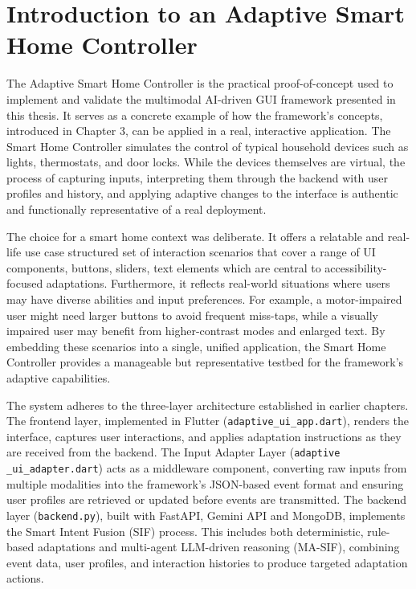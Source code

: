 \documentclass[openany]{book}
\begin{document}
\section{Introduction to an Adaptive Smart Home Controller}
The Adaptive Smart Home Controller is the practical proof-of-concept used to implement and validate the multimodal AI-driven GUI framework presented in this thesis. It serves as a concrete example of how the framework’s concepts, introduced in Chapter 3, can be applied in a real, interactive application. The Smart Home Controller simulates the control of typical household devices such as lights, thermostats, and door locks. While the devices themselves are virtual, the process of capturing inputs, interpreting them through the backend with user profiles and history, and applying adaptive changes to the interface is authentic and functionally representative of a real deployment.

The choice for a smart home context was deliberate. It offers a relatable and real-life use case structured set of interaction scenarios that cover a range of UI components, buttons, sliders, text elements which are central to accessibility-focused adaptations. Furthermore, it reflects real-world situations where users may have diverse abilities and input preferences. For example, a motor-impaired user might need larger buttons to avoid frequent miss-taps, while a visually impaired user may benefit from higher-contrast modes and enlarged text. By embedding these scenarios into a single, unified application, the Smart Home Controller provides a manageable but representative testbed for the framework’s adaptive capabilities.

The system adheres to the three-layer architecture established in earlier chapters. The frontend layer, implemented in Flutter (\texttt{adaptive\_ui\_app.dart}), renders the interface, captures user interactions, and applies adaptation instructions as they are received from the backend. The Input Adapter Layer (\texttt{adaptive\\\_ui\_adapter.dart}) acts as a middleware component, converting raw inputs from multiple modalities into the framework’s JSON-based event format and ensuring user profiles are retrieved or updated before events are transmitted. The backend layer (\texttt{backend.py}), built with FastAPI, Gemini API and MongoDB, implements the Smart Intent Fusion (SIF) process. This includes both deterministic, rule-based adaptations and multi-agent LLM-driven reasoning (MA-SIF), combining event data, user profiles, and interaction histories to produce targeted adaptation actions.
\end{document}
